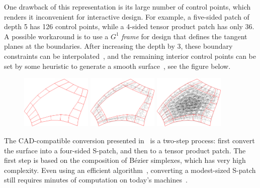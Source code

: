 \documentclass{article}
\begin{document}
One drawback of this representation is its large number of control points, which renders it
inconvenient for interactive design. For example, a five-sided patch of depth 5 has 126 control
points, while a 4-sided tensor product patch has only 36. A possible workaround is to use a
$G^1$ \emph{frame} for design that defines the tangent planes at the boundaries.
After increasing the depth by 3, these boundary constraints can be interpolated~\cite{spatch2},
and the remaining interior control points can be set by some heuristic to generate a smooth
surface~\cite{salvi-kepaf}, see the figure below.
\begin{figure}[h!]
  \centering
  \includegraphics[width = 0.3\textwidth]{images/5-5-bezier-ribbon.png}
  \hfill
  \includegraphics[width = 0.3\textwidth]{images/5-5-cnet-ribbon.png}
  \hfill
  \includegraphics[width = 0.3\textwidth]{images/5-5-cnet-full.png}
\end{figure}

The CAD-compatible conversion presented in~\cite{spatch1} is a two-step process:
first convert the surface into a
four-sided S-patch, and then to a tensor product patch. The first step is based on the
composition of B\'ezier simplexes, which has very high complexity.
Even using an efficient algorithm~\cite{simplex2}, converting a modest-sized S-patch
still requires minutes of computation on today's machines~\cite{salvi-wait}.
\end{document}
